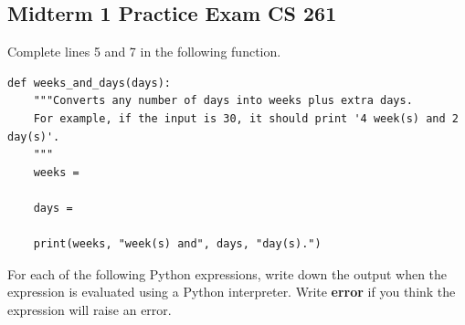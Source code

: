 \documentclass[12pt]{exam}
\begin{document}
\pagestyle{empty}
\graphicspath{{/home/brian/Dropbox/HSC/Spring16/Math111/}}
\lstset{language=Python}
\lstset{columns=fixed}
\lstset{showstringspaces=false}

\subsection*{Midterm 1 Practice Exam   \hfill CS 261}

\begin{questions}

\question[8] Complete lines 5 and 7 in the following function. 
\begin{lstlisting}
def weeks_and_days(days):
    """Converts any number of days into weeks plus extra days.  
    For example, if the input is 30, it should print '4 week(s) and 2 day(s)'.
    """
    weeks = 

    days = 

    print(weeks, "week(s) and", days, "day(s).")
\end{lstlisting}

\question[12] For each of the following Python expressions, write down the output when the expression is evaluated using a Python interpreter. Write \textbf{error} if you think the expression will raise an error.



\end{questions}
\end{document}

